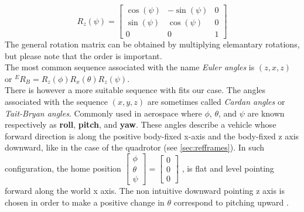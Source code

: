 \begin{equation}
R_z(\psi) = \begin{bmatrix} \cos(\psi)  & -\sin(\psi) &0 \\
							\sin(\psi) & \cos(\psi) &0\\
                              0         & 0          &1 
\end{bmatrix}
\end{equation}
The general rotation matrix can be obtained by multiplying elemantary rotations, but please note that the order is important.\\

\noindent
The most common sequence associated with the name \textit{Euler angles} is $(z, x, z)$ or ${}^ER_B = R_z(\phi)R_x(\theta)R_z(\psi)$.\\ 

\noindent
There is however a more suitable sequence with fits our case. The angles associated with the sequence $(x, y, z)$ are sometimes called \textit{Cardan angles} or \textit{Tait-Bryan angles}. Commonly used in aerospace where $\phi$, $\theta$, and $\psi$ are known respectively as\textbf{ roll}, \textbf{pitch}, and \textbf{yaw}. These angles describe a vehicle whose forward direction is along the positive body-fixed x-axis and the body-fixed z axis downward, like in the case of the quadrotor (see \ref{sec:refframes}). In such configuration, the home position $\begin{bmatrix}\phi\\ \theta \\ \psi \end{bmatrix} = \begin{bmatrix}0\\ 0 \\ 0 \end{bmatrix}$ , is flat and level pointing forward along the world x axis. The non intuitive downward pointing z axis is chosen in order to make a positive change in $\theta$ correspond to pitching upward \cite{Diebel2006}. \\

